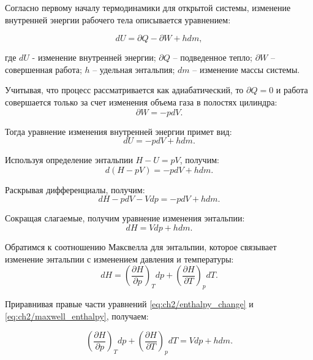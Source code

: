 Согласно первому началу термодинамики для открытой системы, изменение внутренней энергии рабочего тела описывается уравнением:

\begin{equation}
\label{eq:ch2/first_law}
    dU = \partial Q - \partial W + hdm,
\end{equation}

где $dU$ - изменение внутренней энергии;
$\partial Q$ -- подведенное тепло;
$\partial W$ -- совершенная работа;
$h$ -- удельная энтальпия;
$dm$ -- изменение массы системы.

Учитывая, что процесс рассматривается как адиабатический,
то $\partial Q = 0$ и работа совершается только за счет изменения объема газа в полостях цилиндра:
\begin{equation}
\label{eq:ch2/work}
    \partial W = -pdV.
\end{equation}

Тогда уравнение изменения внутренней энергии примет вид:
\begin{equation}
\label{eq:ch2/internal_energy_change}
    dU = -pdV + hdm.
\end{equation}

Используя определение энтальпии $H - U = pV$, получим:
\begin{equation}
\label{eq:ch2/enthalpy_definition}
    d(H-pV) = -pdV + hdm.
\end{equation}

Раскрывая дифференциалы, получим:
\begin{equation}
\label{eq:ch2/enthalpy_differential}
    dH - pdV - Vdp = -pdV + hdm.
\end{equation}

Сокращая слагаемые, получим уравнение изменения энтальпии:
\begin{equation}
\label{eq:ch2/enthalpy_change}
    dH = Vdp + hdm.
\end{equation}

Обратимся к соотношению Максвелла для энтальпии, которое связывает изменение
энтальпии с изменением давления и температуры:
\begin{equation}
\label{eq:ch2/maxwell_enthalpy}
    dH = \left(
    \frac{\partial H}{\partial p}
    \right)_T dp + \left(
    \frac{\partial H}{\partial T}
    \right)_p dT.
\end{equation}

Приравнивая правые части уравнений \eqref{eq:ch2/enthalpy_change} и \eqref{eq:ch2/maxwell_enthalpy}, получаем:

\begin{equation}
\label{eq:ch2/enthalpy_equality}
    \left(
    \frac{\partial H}{\partial p}
    \right)_T dp + \left(
    \frac{\partial H}{\partial T}
    \right)_p dT = Vdp + hdm.
\end{equation}

